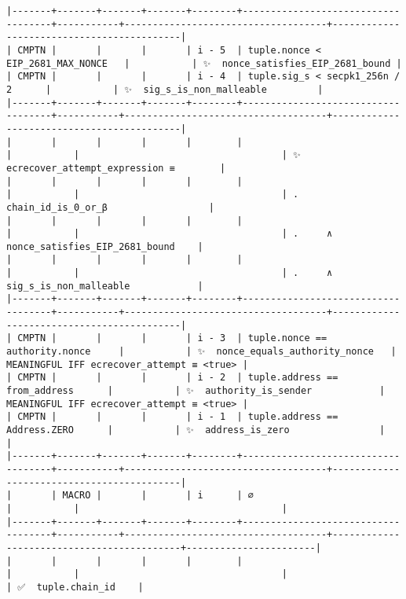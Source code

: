 \documentclass[varwidth=\maxdimen,margin=0.5cm,multi={verbatim}]{standalone}
\begin{document}
\begin{verbatim}
|-------+-------+-------+-------+--------+------------------------------------+-----------+------------------------------------+-------------------------------------------|
| CMPTN |       |       |       | i - 5  | tuple.nonce < EIP_2681_MAX_NONCE   |           | ✨  nonce_satisfies_EIP_2681_bound |
| CMPTN |       |       |       | i - 4  | tuple.sig_s < secpk1_256n / 2      |           | ✨  sig_s_is_non_malleable         |
|-------+-------+-------+-------+--------+------------------------------------+-----------+------------------------------------+-------------------------------------------|
|       |       |       |       |        |                                    |           |                                    | ✨  ecrecover_attempt_expression ≡        |
|       |       |       |       |        |                                    |           |                                    | .     chain_id_is_0_or_β                  |
|       |       |       |       |        |                                    |           |                                    | .     ∧ nonce_satisfies_EIP_2681_bound    |
|       |       |       |       |        |                                    |           |                                    | .     ∧ sig_s_is_non_malleable            |
|-------+-------+-------+-------+--------+------------------------------------+-----------+------------------------------------+-------------------------------------------|
| CMPTN |       |       |       | i - 3  | tuple.nonce == authority.nonce     |           | ✨  nonce_equals_authority_nonce   | MEANINGFUL IFF ecrecover_attempt ≡ <true> |
| CMPTN |       |       |       | i - 2  | tuple.address == from_address      |           | ✨  authority_is_sender            | MEANINGFUL IFF ecrecover_attempt ≡ <true> |
| CMPTN |       |       |       | i - 1  | tuple.address == Address.ZERO      |           | ✨  address_is_zero                |                                           |
|-------+-------+-------+-------+--------+------------------------------------+-----------+------------------------------------+-------------------------------------------|
|       | MACRO |       |       | i      | ∅                                  |           |                                    |
|-------+-------+-------+-------+--------+------------------------------------+-----------+------------------------------------+-------------------------------------------+-----------------------|
|       |       |       |       |        |                                    |           |                                    |                                           | ✅  tuple.chain_id    |

\end{verbatim}
\end{document}
